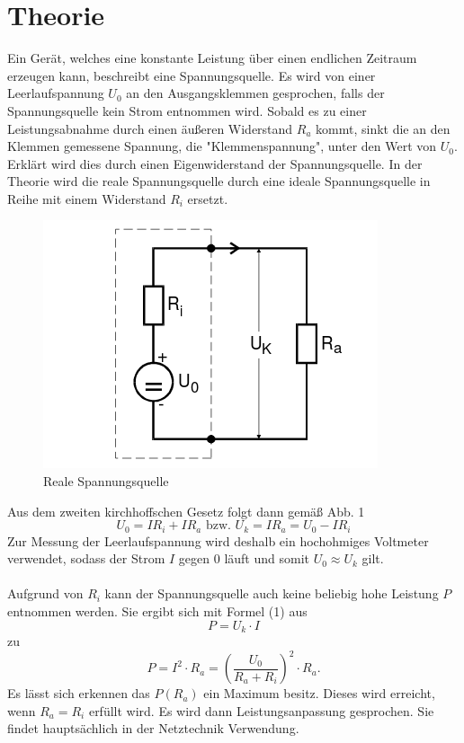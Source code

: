 \section{Theorie}
\label{sec:Theorie}

Ein Gerät, welches eine konstante Leistung über
einen endlichen Zeitraum erzeugen kann, beschreibt eine Spannungsquelle. Es wird von einer Leerlaufspannung $ U_0 $
an den Ausgangsklemmen gesprochen, falls der Spannungsquelle kein Strom entnommen wird.
Sobald es zu einer Leistungsabnahme durch einen äußeren Widerstand $ R_a $ kommt,
sinkt die an den Klemmen gemessene Spannung, die "Klemmenspannung", unter den Wert von $ U_0 $. Erklärt wird
dies durch einen Eigenwiderstand der Spannungsquelle. In der Theorie wird die reale
Spannungsquelle durch eine ideale Spannungsquelle in Reihe mit einem Widerstand $ R_i$
ersetzt.
\begin{figure}[H]
  \centering

  \includegraphics[width=\linewidth-200pt,height=\textheight-200pt,keepaspectratio]{content/Spannungsquelle1.png}
  \caption{Reale Spannungsquelle}
  \label{fig:Spannung1}
\end{figure}

Aus dem zweiten kirchhoffschen Gesetz folgt dann gemäß Abb. 1
\begin{equation}
	 U_0 = I R_i + I R_a  \text{ bzw. } U_k = I R_a = U_0-IR_i
\end{equation}
Zur Messung der Leerlaufspannung wird deshalb ein hochohmiges Voltmeter verwendet,
sodass der Strom $I$ gegen $0$ läuft und somit $U_0 \approx U_k$ gilt.\\
\\
Aufgrund von $R_i$ kann der Spannungsquelle auch keine beliebig hohe Leistung $P$
entnommen werden. Sie ergibt sich mit Formel (1) aus
\begin{equation}
	P = U_k \cdot I
\end{equation}
zu
\begin{equation}
P = I^2 \cdot R_a = \left(\frac{U_0}{R_a+R_i}\right)^2 \cdot R_a\text{.}
\end{equation}
Es lässt sich erkennen das $P(R_a)$ ein Maximum besitz. Dieses wird erreicht, wenn $R_a = R_i$ erfüllt wird.
Es wird dann Leistungsanpassung gesprochen. Sie findet hauptsächlich in der Netztechnik Verwendung.
